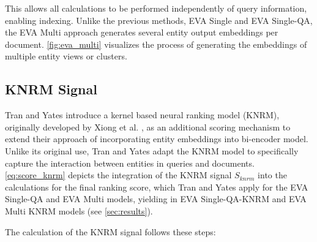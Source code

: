 This allows all calculations to be performed independently of query information, enabling indexing. Unlike the previous methods, EVA Single and EVA Single-QA, the EVA Multi approach generates several entity output embeddings per document. \autoref{fig:eva_multi} visualizes the process of generating the embeddings of multiple entity views or clusters.

\subsection{KNRM Signal}\label{subsec:knrm}

Tran and Yates introduce a kernel based neural ranking model (KNRM), originally developed by Xiong et al. \cite{xiong2017end}, as an additional scoring mechanism to extend their approach of incorporating entity embeddings into bi-encoder model. Unlike its original use, Tran and Yates adapt the KNRM model to specifically capture the interaction between entities in queries and documents. \autoref{eq:score_knrm} depicts the integration of the KNRM signal $S_{knrm}$ into the calculations for the final ranking score, which Tran and Yates apply for the EVA Single-QA and EVA Multi models, yielding in EVA Single-QA-KNRM and EVA Multi KNRM models (see \autoref{sec:results}). 

The calculation of the KNRM signal follows these steps:

